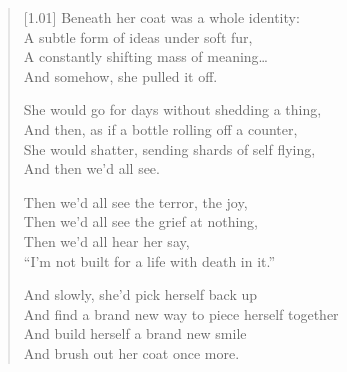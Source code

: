 \begin{verse}[1.01\textwidth]
Beneath her coat was a whole identity:\\
A subtle form of ideas under soft fur,\\
A constantly shifting mass of meaning\ldots{}\\
And somehow, she pulled it off.

She would go for days without shedding a thing,\\
And then, as if a bottle rolling off a counter,\\
She would shatter, sending shards of self flying,\\
And then we'd all see.

Then we'd all see the terror, the joy,\\
Then we'd all see the grief at nothing,\\
Then we'd all hear her say,\\
``I'm not built for a life with death in it.''

And slowly, she'd pick herself back up\\
And find a brand new way to piece herself together\\
And build herself a brand new smile\\
And brush out her coat once more.
\end{verse}
